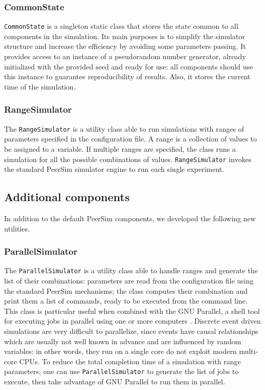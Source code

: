 \subsubsection{CommonState}
\texttt{CommonState} is a singleton static class that stores the state common to all components in the simulation.
Its main purposes is to simplify the simulator structure and increase the efficiency by avoiding some parameters passing.
It provides access to an instance of a pseudorandom number generator, already initialized with the provided seed and ready for use:
all components should use this instance to guarantee reproducibility of results.
Also, it stores the current time of the simulation.

\subsubsection{RangeSimulator}
The \texttt{RangeSimulator} is a utility class able to run simulations with ranges of parameters specified in the configuration file.
A range is a collection of values to be assigned to a variable.
If multiple ranges are specified, the class runs a simulation for all the possible combinations of values.
\texttt{RangeSimulator} invokes the standard PeerSim simulator engine to run each single experiment.

\subsection{Additional components}
In addition to the default PeerSim components, we developed the following new utilities.

\subsubsection{ParallelSimulator}
The \texttt{ParallelSimulator} is a utility class able to handle ranges and generate the list of their combinations:
parameters are read from the configuration file using the standard PeerSim mechanisms;
the class computes their combination and print them a list of commands, ready to be executed from the command line.
This class is particular useful when combined with the GNU Parallel, a shell tool for executing jobs in parallel using one or more computers \cite{gnu_parallel}.
Discrete event driven simulations are very difficult to parallelize, since events have causal relationships which are usually not well known in advance and are influenced by random variables:
in other words, they run on a single core do not exploit modern multi-core \ac{CPU}s.
To reduce the total completion time of a simulation with range parameters, one can use \texttt{ParallelSimulator} to generate the list of jobs to execute, then take advantage of GNU Parallel to run them in parallel.

